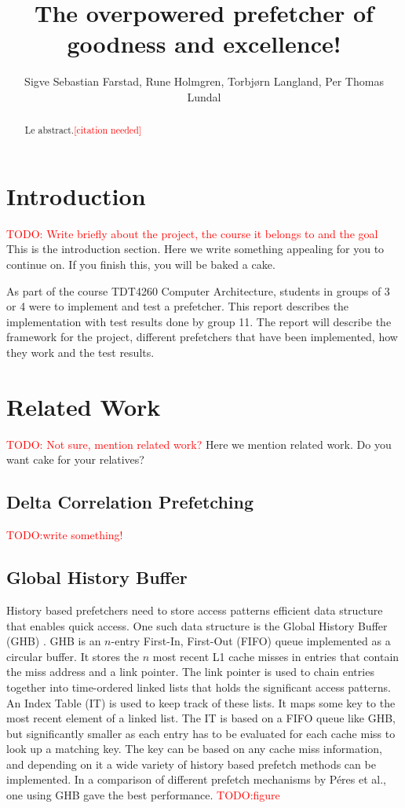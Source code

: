 \documentclass[a4paper]{IEEEtran}
\title{The overpowered prefetcher of goodness and excellence!}
\author{
    Sigve Sebastian Farstad,
    Rune Holmgren,
    Torbjørn Langland,
    Per Thomas Lundal
}
\newcommand\TODO[1]{\textcolor{red}{TODO:#1}}
\newcommand\todo[1]{\TODO{#1}}
\newcommand\cn{\textcolor{red}{[citation needed]}}
\begin{document}
\maketitle

\begin{abstract}
    Le abstract.\cn
\end{abstract}

\section{Introduction}

\todo{ Write briefly about the project, the course it belongs to and the goal}
This is the introduction section.
Here we write something appealing for you to continue on.
If you finish this, you will be baked a cake.

As part of the course TDT4260 Computer Architecture, students in groups of 3 or 4 were to implement and test a prefetcher.
This report describes the implementation with test results done by group 11.
The report will describe the framework for the project, different prefetchers that have been implemented, how they work and the test results.

\section{Related Work}

\todo{ Not sure, mention related work?}
Here we mention related work. Do you want cake for your relatives?

\subsection{Delta Correlation Prefetching}
\todo{write something!}

\subsection{Global History Buffer}
History based prefetchers need to store access patterns efficient data structure that enables quick access.
One such data structure is the Global History Buffer (GHB) \cite{ghb}.
GHB is an $n$-entry First-In, First-Out (FIFO) queue implemented as a circular buffer.
It stores the $n$ most recent L1 cache misses in entries that contain the miss address and a link pointer.
The link pointer is used to chain entries together into time-ordered linked lists that holds the significant access patterns.
An Index Table (IT) is used to keep track of these lists.
It maps some key to the most recent element of a linked list.
The IT is based on a FIFO queue like GHB, but significantly smaller as each entry has to be evaluated for each cache miss to look up a matching key.
The key can be based on any cache miss information, and depending on it a wide variety of history based prefetch methods can be implemented.
In a comparison of different prefetch mechanisms by Péres et al.\cite{microlib}, one using GHB gave the best performance.
\todo{figure}
\end{document}
